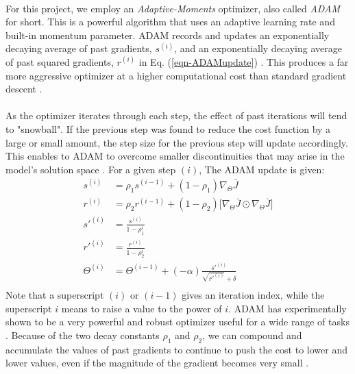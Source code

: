 \documentclass[12pt,letterpaper]{article}
\begin{document}
\paragraph*{}For this project, we employ an \textit{Adaptive-Moments} optimizer, also called \textit{ADAM} for short. This is a powerful algorithm that uses an adaptive learning rate and built-in momentum parameter. ADAM records and updates an exponentially decaying average of past gradients, $s^{(i)}$, and an exponentially decaying average of past squared gradients, $r^{(i)}$ in Eq. (\ref{eqn-ADAMupdate}) \cite{Geron}. This produces a far more aggressive optimizer at a higher computational cost than standard gradient descent \cite{Goodfellow}.

\paragraph*{}As the optimizer iterates through each step, the effect of past iterations will tend to "snowball". If the previous step was found to reduce the cost function by a large or small amount, the step size for the previous step will update accordingly. This enables to ADAM to overcome smaller discontinuities that may arise in the model's solution space \cite{Goodfellow}. For a given step $(i)$, The ADAM update is given:
\begin{equation}
\label{eqn-ADAMupdate}
\begin{split}
s^{(i)} &= \rho_1 s^{(i-1)} + (1 - \rho_1) \nabla_{\Theta} \bar{J}  \\
r^{(i)} &= \rho_2 r^{(i-1)} + (1 - \rho_2) \Big[ \nabla_{\Theta} \bar{J} \odot \nabla_{\Theta} \bar{J} \Big]  \\
s'^{(i)} &= \frac{s^{(i)}}{1-\rho_1^i} \\
r'^{(i)} &= \frac{r^{(i)}}{1-\rho_2^i} \\
\Theta^{(i)} &= \Theta^{(i-1)} + (-\alpha)\frac{s'^{(i)}}{\sqrt{r'^{(i)}}+\delta} \\
\end{split}
\end{equation}
Note that a superscript $(i)$ or $(i-1)$ gives an iteration index, while the superscript $i$ means to raise a value to the power of $i$. ADAM has experimentally shown to be a very powerful and robust optimizer useful for a wide range of tasks \cite{Goodfellow}. Because of the two decay constants $\rho_1$ and $\rho_2$, we can compound and accumulate the values of past gradients to continue to push the cost to lower and lower values, even if the magnitude of the gradient becomes very small \cite{Geron}. 
\end{document}

